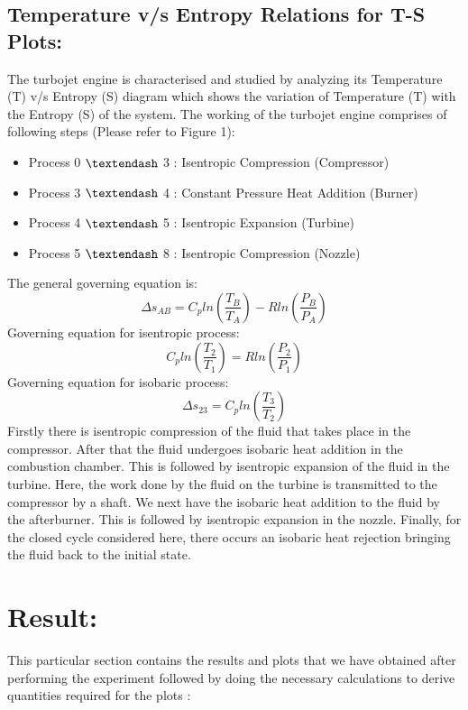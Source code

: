 \documentclass[12pt,a4paper]{article}
\begin{document}
\subsection{Temperature v/s Entropy Relations for T-S Plots:}
The turbojet engine is characterised and studied by analyzing its Temperature (T) v/s Entropy (S) diagram which shows the variation of Temperature (T) with the Entropy (S) of the system. The working of the turbojet engine comprises of following steps (Please refer to Figure 1):
\begin{itemize}
\item Process 0 $\textendash$ 3 : Isentropic Compression (Compressor)
\item Process 3 $\textendash$ 4 : Constant Pressure Heat Addition (Burner)
\item Process 4 $\textendash$ 5 : Isentropic Expansion (Turbine)
\item Process 5 $\textendash$ 8 : Isentropic Compression (Nozzle)
\end{itemize}
The general governing equation is:
\begin{equation}
    \text{$\Delta s_{AB}$} = \text{$C_p ln$}(\frac{T_B}{T_A}) - \text{$R ln$}(\frac{P_B}{P_A})
\end{equation}
Governing equation for isentropic process:
\begin{equation}
    \text{$C_p ln$}(\frac{T_2}{T_1}) = \text{$R ln$}(\frac{P_2}{P_1})
\end{equation}
Governing equation for isobaric process:
\begin{equation}
   \text{$\Delta s_{23}$} = \text{$C_p ln$}(\frac{T_3}{T_2})
\end{equation}
Firstly there is isentropic compression of the fluid that takes place in the compressor. After that the fluid undergoes isobaric heat addition in the combustion chamber. This is followed by isentropic expansion of the fluid in the turbine. Here, the work done by the fluid on the turbine is transmitted to the compressor by a shaft. We next have the isobaric heat addition to the fluid by the afterburner. This is followed by isentropic expansion in the nozzle. Finally, for the closed cycle considered here, there occurs an isobaric heat rejection bringing the fluid back to the initial state.
\section{Result:}
This particular section contains the results and plots that we have obtained after performing the experiment followed by doing the necessary calculations to derive quantities required for the plots :
\end{document}

